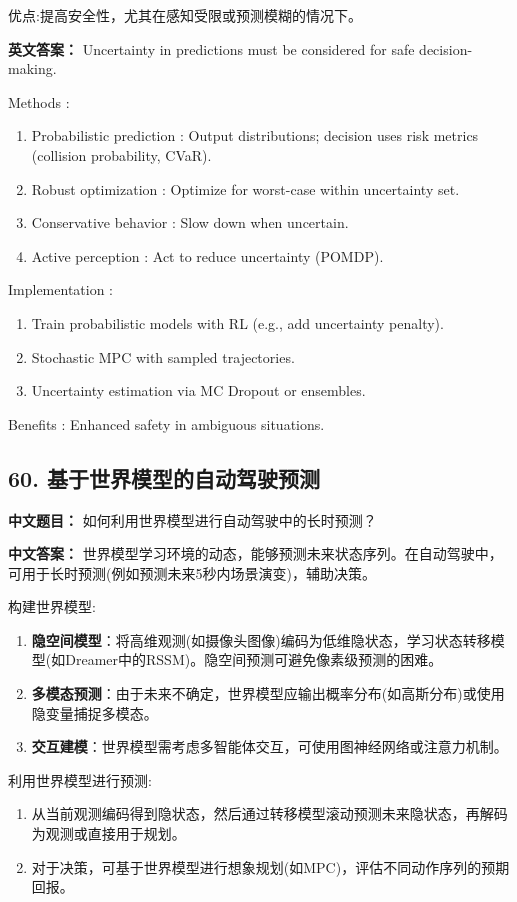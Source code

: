 \documentclass[10pt,a4paper]{ctexart}
\begin{document}
 优点:提高安全性，尤其在感知受限或预测模糊的情况下。

\textbf{英文答案：}  
Uncertainty in predictions must be considered for safe decision-making.

 Methods :
\begin{enumerate}
    \item Probabilistic prediction : Output distributions; decision uses risk metrics (collision probability, CVaR).
    \item Robust optimization : Optimize for worst-case within uncertainty set.
    \item Conservative behavior : Slow down when uncertain.
    \item Active perception : Act to reduce uncertainty (POMDP).
\end{enumerate}

 Implementation :
\begin{enumerate}
    \item Train probabilistic models with RL (e.g., add uncertainty penalty).
    \item Stochastic MPC with sampled trajectories.
    \item Uncertainty estimation via MC Dropout or ensembles.
\end{enumerate}

 Benefits : Enhanced safety in ambiguous situations.

\subsection*{60. 基于世界模型的自动驾驶预测}
\textbf{中文题目：} 如何利用世界模型进行自动驾驶中的长时预测？

\textbf{中文答案：}  
世界模型学习环境的动态，能够预测未来状态序列。在自动驾驶中，可用于长时预测(例如预测未来5秒内场景演变)，辅助决策。

 构建世界模型:
\begin{enumerate}
    \item \textbf{隐空间模型}：将高维观测(如摄像头图像)编码为低维隐状态，学习状态转移模型(如Dreamer中的RSSM)。隐空间预测可避免像素级预测的困难。
    \item \textbf{多模态预测}：由于未来不确定，世界模型应输出概率分布(如高斯分布)或使用隐变量捕捉多模态。
    \item \textbf{交互建模}：世界模型需考虑多智能体交互，可使用图神经网络或注意力机制。
\end{enumerate}

 利用世界模型进行预测:
\begin{enumerate}
    \item 从当前观测编码得到隐状态，然后通过转移模型滚动预测未来隐状态，再解码为观测或直接用于规划。
    \item 对于决策，可基于世界模型进行想象规划(如MPC)，评估不同动作序列的预期回报。
\end{enumerate}
\end{document}
